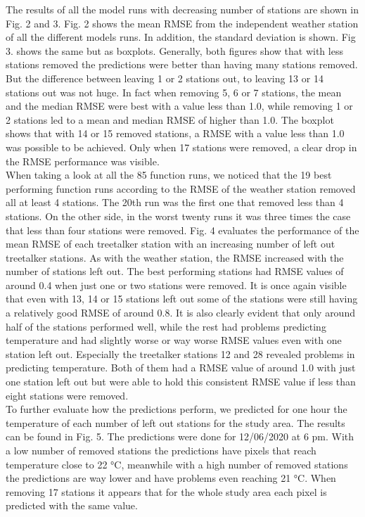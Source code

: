 \documentclass[5p]{elsarticle} %
\begin{document}
The results of all the model runs with decreasing number of stations are shown in Fig. 2 and 3. Fig. 2 shows the mean RMSE from the independent weather station of all the different models runs. In addition, the standard deviation is shown. Fig 3. shows the same but as boxplots. Generally, both figures show that with less stations removed the predictions were better than having many stations removed. But the difference between leaving 1 or 2 stations out, to leaving 13 or 14 stations out was not huge. In fact when removing 5, 6 or 7 stations, the mean and the median RMSE were best with a value less than 1.0, while removing 1 or 2 stations led to a mean and median RMSE of higher than 1.0. The boxplot shows that with 14 or 15 removed stations, a RMSE with a value less than 1.0 was possible to be achieved. Only when 17 stations were removed, a clear drop in the RMSE performance was visible.\\
When taking a look at all the 85 function runs, we noticed that the 19 best performing function runs according to the RMSE of the weather station removed all at least 4 stations. The 20th run was the first one that removed less than 4 stations. On the other side, in the worst twenty runs it was three times the case that less than four stations were removed. 
Fig. 4 evaluates the performance of the mean RMSE of each treetalker station with an increasing number of left out treetalker stations. As with the weather station, the RMSE increased with the number of stations left out. The best performing stations had RMSE values of around 0.4 when just one or two stations were removed. It is once again visible that even with 13, 14 or 15 stations left out some of the stations were still having a relatively good RMSE of around 0.8. It is also clearly evident that only around half of the stations performed well, while the rest had problems predicting temperature and had slightly worse or way worse RMSE values even with one station left out. Especially the treetalker stations 12 and 28 revealed problems in predicting temperature. Both of them had a RMSE value of around 1.0 with just one station left out but were able to hold this consistent RMSE value if less than eight stations were removed.\\
To further evaluate how the predictions perform, we predicted for one hour the temperature of each number of left out stations for the study area. The results can be found in Fig. 5. The predictions were done for 12/06/2020 at 6 pm. With a low number of removed stations the predictions have pixels that reach temperature close to  22 °C, meanwhile with a high number of removed stations the predictions are way lower and have problems even reaching  21 °C. When removing 17 stations it appears that for the whole study area each pixel is predicted with the same value. 
\end{document}
